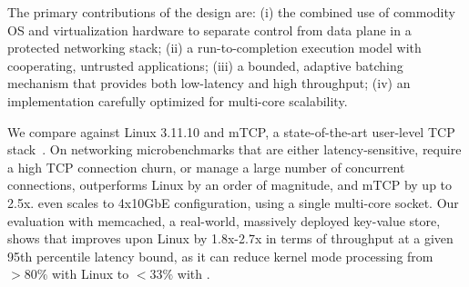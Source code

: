 


The primary contributions of the \ix design are: (i) the combined use
of commodity OS and virtualization hardware to separate control from
data plane in a protected networking stack; (ii) a run-to-completion
execution model with cooperating, untrusted applications; (iii) a
bounded, adaptive batching mechanism that provides both low-latency
and high throughput; (iv) an implementation carefully optimized for
multi-core scalability. 

We compare \ix against Linux 3.11.10 and mTCP, a state-of-the-art
user-level TCP stack~\cite{jeong2014mtcp}.  On networking
microbenchmarks that are either latency-sensitive, require a high TCP
connection churn, or manage a large number of concurrent connections,
\ix outperforms Linux by an order of magnitude, and mTCP by up to
2.5x.  \ix even scales to 4x10GbE configuration, using a single
multi-core socket.  Our evaluation with memcached, a real-world,
massively deployed key-value store, shows that \ix improves upon Linux
by 1.8x-2.7x in terms of throughput at a given 95th
percentile latency bound, as it can reduce kernel mode processing from
$>80\%$ with Linux to $<33\%$ with \ix.


